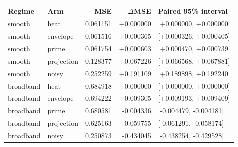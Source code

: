 \begin{tabular}{llrrl}\toprule
Regime & Arm & MSE & $\Delta$MSE & Paired 95\% interval \\\midrule
smooth & heat & 0.061151 & +0.000000 & [+0.000000, +0.000000] \\
smooth & envelope & 0.061516 & +0.000365 & [+0.000326, +0.000405] \\
smooth & prime & 0.061754 & +0.000603 & [+0.000470, +0.000739] \\
smooth & projection & 0.128377 & +0.067226 & [+0.066568, +0.067881] \\
smooth & noisy & 0.252259 & +0.191109 & [+0.189898, +0.192240] \\
broadband & heat & 0.684918 & +0.000000 & [+0.000000, +0.000000] \\
broadband & envelope & 0.694222 & +0.009305 & [+0.009193, +0.009409] \\
broadband & prime & 0.680581 & -0.004336 & [-0.004479, -0.004181] \\
broadband & projection & 0.625163 & -0.059755 & [-0.061291, -0.058174] \\
broadband & noisy & 0.250873 & -0.434045 & [-0.438254, -0.429528] \\
\bottomrule\end{tabular}
